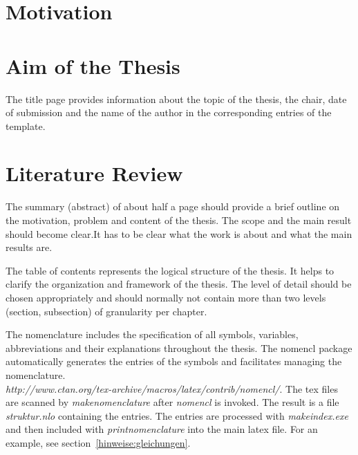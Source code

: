 \section{Motivation}
\label{hinweise:titelblatt}

\section{Aim of the Thesis}
The title page provides information about the topic of the thesis, the chair, date of submission and the name of the author in the corresponding entries of the template.

\section{Literature Review}
\label{hinweise:kurzfassung}

The summary (abstract) of about half a page should provide a brief outline on the motivation, problem and content of the thesis. The scope and the main result should become clear.It has to be clear what the work is about and what the main results are.


\label{hinweise:inhaltsverzeichnis}

The table of contents represents the logical structure of the thesis.
It helps to clarify the organization and framework of the thesis.
The level of detail should be chosen appropriately and should normally not contain more than two levels (section, subsection) of granularity per chapter.

\label{hinweise:nomenklatur}

The nomenclature includes the specification of all symbols, variables, abbreviations and their explanations throughout the thesis.
The nomencl package automatically generates the entries of the symbols and facilitates
managing the nomenclature.\\
\emph{http://www.ctan.org/tex-archive/macros/latex/contrib/nomencl/}.
The tex files are scanned by \textit{makenomenclature} after \textit{nomencl} is invoked.
The result is a file \textit{struktur.nlo} containing the entries.
The entries are processed with \textit{makeindex.exe} and then included with \textit{printnomenclature} into the main latex file.
For an example, see section~\ref{hinweise:gleichungen}.

